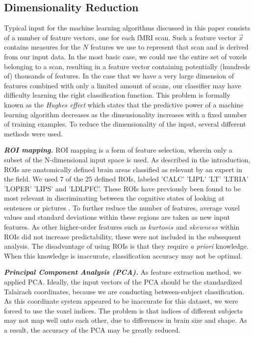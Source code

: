 \documentclass[preprint,journal,11pt]{vgtc}
\begin{document}
\subsection{Dimensionality Reduction}
\label{sec:dimensionalityReduction}
Typical input for the machine learning algorithms discussed in this paper consists of a number of feature vectors, one for each fMRI scan. Such a feature vector $\vec{x}$ contains measures for the $N$ features we use to represent that scan and is derived from our input data. In the most basic case, we could use the entire set of voxels belonging to a scan, resulting in a feature vector containing potentially (hundreds of) thousands of features.
In the case that we have a very large dimension of features combined with only a limited amount of scans, our classifier may have difficulty learning the right classification function. This problem is formally known as the \textit{Hughes effect}\cite{Hughes1054102} which states that the predictive power of a machine learning algorithm decreases as the dimensionality increases with a fixed number of training examples. To reduce the dimensionality of the input, several different methods were used.

\textbf{\emph{ROI mapping.}} ROI mapping is a form of feature selection, wherein only a subset of the N-dimensional input space is used. As described in the introduction, ROIs are anatomically defined brain areas classified as relevant by an expert in the field. We used 7 of the 25 defined ROIs, labeled  'CALC' 'LIPL' 'LT' 'LTRIA' 'LOPER' 'LIPS' and  'LDLPFC'. These ROIs have previously been found to be most relevant in discriminating between the cognitive states of looking at sentences or pictures \cite{wa:2003betw}. To further reduce the number of features, average voxel values and standard deviations within these regions are taken as new input features. As other higher-order features such as $kurtosis$ and $skewness$ within ROIs did not increase predictability, these were not included in the subsequent analysis. The disadvantage of using ROIs is that they require \textit{a priori} knowledge. When this knowledge is inaccurate, classification accuracy may not be optimal.

\textbf{\emph{Principal Component Analysis (PCA).}} As feature extraction method, we applied PCA. Ideally, the input vectors of the PCA should be the standardized Talairach coordinates, because we are conducting between-subject classification. As this coordinate system appeared to be inaccurate for this dataset, we were forced to use the voxel indices. The problem is that indices of different subjects may not map well onto each other, due to differences in brain size and shape. As a result, the accuracy of the PCA may be greatly reduced.   
\end{document}
